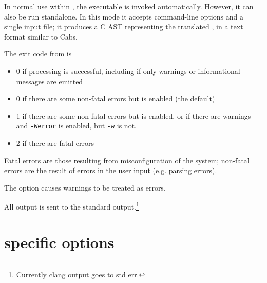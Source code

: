 In normal use within \framac, the \irg executable is
invoked automatically. However, it can also be run standalone.
In this mode it accepts command-line options and a single input file;
it produces a C AST representing the translated \cpp, in a text format similar to Cabs.

The exit code from \irg is
\begin{itemize}
\item 0 if processing is successful, including if only warnings or informational messages are emitted
\item 0 if there are some non-fatal errors but  is enabled (the default)
\item 1 if there are some non-fatal errors but  is enabled, or if there are warnings and \lstinline|-Werror| is enabled, but \lstinline|-w| is not.
\item 2 if there are fatal errors
\end{itemize}
Fatal errors are those resulting from misconfiguration of the system; non-fatal errors are the result of errors in the user input (e.g. parsing errors).

The  option causes warnings to be treated as errors. 

All output is sent to the standard output.\footnote{Currently clang output goes to std err.}

\section{\irg specific options}
\label{sec:fcloptions}

